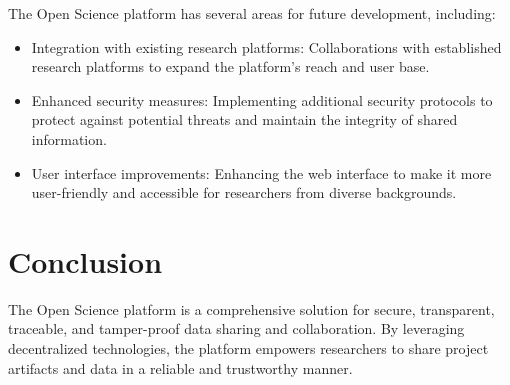 \documentclass{article}
\begin{document}
The Open Science platform has several areas for future development, including:

\begin{itemize}
    \item Integration with existing research platforms: Collaborations with established research platforms to expand the platform's reach and user base.
    \item Enhanced security measures: Implementing additional security protocols to protect against potential threats and maintain the integrity of shared information.
    \item User interface improvements: Enhancing the web interface to make it more user-friendly and accessible for researchers from diverse backgrounds.
\end{itemize}

\section{Conclusion}
The Open Science platform is a comprehensive solution for secure, transparent, traceable, and tamper-proof data sharing and collaboration. By leveraging decentralized technologies, the platform empowers researchers to share project artifacts and data in a reliable and trustworthy manner.
\end{document}
